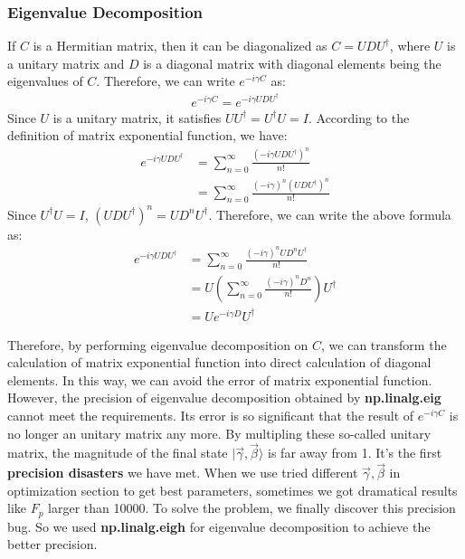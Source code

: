 \subsubsection{Eigenvalue Decomposition}
If $C$ is a Hermitian matrix, then it can be diagonalized as $C = UDU^\dagger$, where $U$ is a unitary matrix and $D$ is a diagonal matrix with diagonal elements being the eigenvalues of $C$. Therefore, we can write $e^{-i\gamma C}$ as:
\begin{align*}
    e^{-i\gamma C} = e^{-i\gamma UDU^\dagger}
\end{align*}
Since $U$ is a unitary matrix, it satisfies $UU^\dagger = U^\dagger U = I$. According to the definition of matrix exponential function, we have:
\begin{align*}
    e^{-i\gamma UDU^\dagger} &= \sum_{n=0}^{\infty} \frac{(-i\gamma UDU^\dagger)^n}{n!}\\
    &= \sum_{n=0}^{\infty} \frac{(-i\gamma)^n (UDU^\dagger)^n}{n!}
\end{align*}
Since $U^\dagger U = I$, $(UDU^\dagger)^n = UD^nU^\dagger$. Therefore, we can write the above formula as:
\begin{align*}
    e^{-i\gamma UDU^\dagger} &= \sum_{n=0}^{\infty} \frac{(-i\gamma)^n UD^nU^\dagger}{n!} \\
    &= U\left(\sum_{n=0}^{\infty} \frac{(-i\gamma)^n D^n}{n!}\right)U^\dagger \\
    &= Ue^{-i\gamma D}U^\dagger
\end{align*}

Therefore, by performing eigenvalue decomposition on $C$, we can transform the calculation of matrix exponential function into direct calculation of diagonal elements. In this way, we can avoid the error of matrix exponential function. However, the precision of eigenvalue decomposition obtained by \textbf{np.linalg.eig} cannot meet the requirements. Its error is so significant that the result of $e^{-i\gamma C}$ is no longer an unitary matrix any more. By multipling these so-called unitary matrix, the magnitude of the final state $|\vec{\gamma}, \vec{\beta}\rangle $ is far away from 1. It's the first \textbf{precision disasters} we have met. When we use tried different $\vec{\gamma}, \vec{\beta} $ in optimization section to get best parameters, sometimes we got dramatical results like $F_p$ larger than 10000.  To solve the problem, we finally discover this precision bug.  So we used \textbf{np.linalg.eigh} for eigenvalue decomposition to achieve the better precision. 




